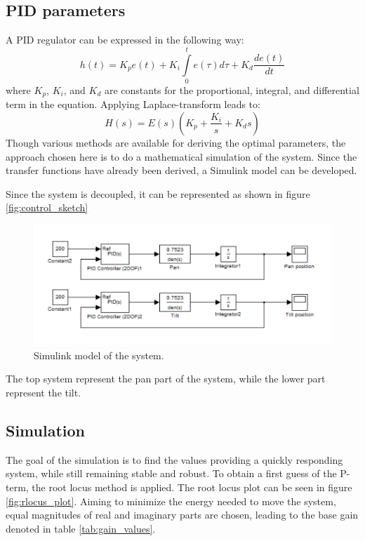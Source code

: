 \subsection{PID parameters}
A PID regulator can be expressed in the following way:
\begin{equation}
	h(t) = K_p e(t) + K_i \int\limits_0^t e(\tau) d\tau + K_d \frac{de(t)}{dt}
\end{equation}
where $K_p$, $K_i$, and $K_d$ are constants for the proportional, integral, and differential term in the equation. Applying Laplace-transform leads to:
\begin{equation}
	H(s) = E(s)(K_p + \frac{K_i}{s} + K_d s)
\end{equation}
Though various methods are available for deriving the optimal parameters, the
approach chosen here is to do a mathematical simulation of the system. Since the
transfer functions have already been derived, a Simulink model can be developed.

Since the system is decoupled, it can be represented as shown in figure \ref{fig:control_sketch}
\begin{figure}[htb]
	\centering
	\includegraphics[width=\textwidth,trim=0 15 0 15]{graphics/Simulink.pdf} %
	\caption{Simulink model of the system.}
	\label{fig:control_simulink}			%
\end{figure}
The top system represent the pan part of the system, while the lower part represent the tilt.

\subsection{Simulation}
The goal of the simulation is to find the values providing a quickly responding system, while still remaining stable and robust. To obtain a first guess of the P-term, the root locus method is applied. The root locus plot can be seen in figure \ref{fig:rlocus_plot}. Aiming to minimize the energy needed to move the system, equal magnitudes of real and imaginary parts are chosen, leading to the base gain denoted in table \ref{tab:gain_values}.

